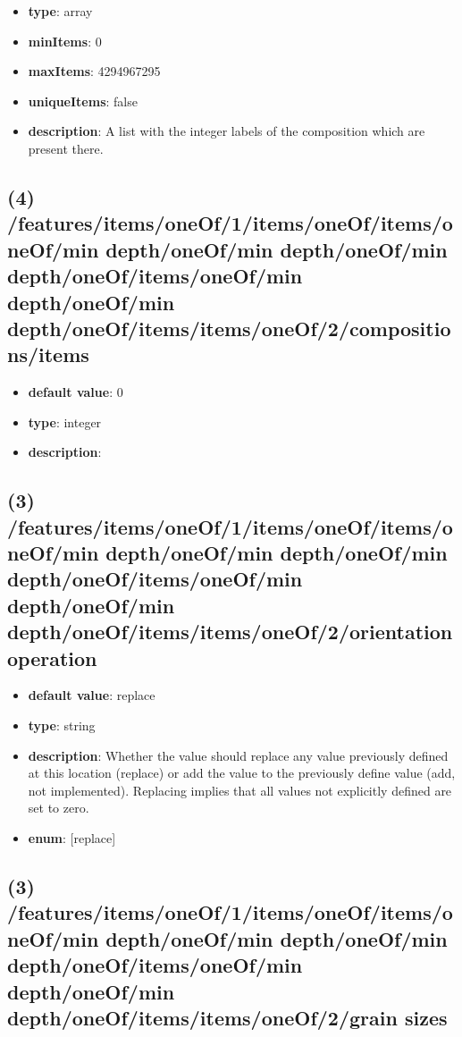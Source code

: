 \begin{itemize}[leftmargin=3em]\item {\bf type}: array
\item {\bf minItems}: 0
\item {\bf maxItems}: 4294967295
\item {\bf uniqueItems}: false
\item {\bf description}: A list with the integer labels of the composition which are present there.
\end{itemize}\subsection{(4) /features/items/oneOf/1/items/oneOf/items/oneOf/min depth/oneOf/min depth/oneOf/min depth/oneOf/items/oneOf/min depth/oneOf/min depth/oneOf/items/items/oneOf/2/compositions/items}
\begin{itemize}[leftmargin=4em]\item {\bf default value}: 0
\item {\bf type}: integer
\item {\bf description}: 
\end{itemize}\subsection{(3) /features/items/oneOf/1/items/oneOf/items/oneOf/min depth/oneOf/min depth/oneOf/min depth/oneOf/items/oneOf/min depth/oneOf/min depth/oneOf/items/items/oneOf/2/orientation operation}
\begin{itemize}[leftmargin=3em]\item {\bf default value}: replace
\item {\bf type}: string
\item {\bf description}: Whether the value should replace any value previously defined at this location (replace) or add the value to the previously define value (add, not implemented). Replacing implies that all values not explicitly defined are set to zero.
\item {\bf enum}: [replace]\end{itemize}\subsection{(3) /features/items/oneOf/1/items/oneOf/items/oneOf/min depth/oneOf/min depth/oneOf/min depth/oneOf/items/oneOf/min depth/oneOf/min depth/oneOf/items/items/oneOf/2/grain sizes}

